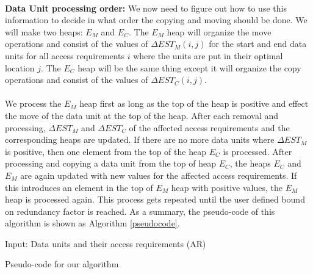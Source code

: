 \\
{\bf Data Unit processing order:} We now need to figure out how to use this
information to decide in what order the copying and moving should be done. We will make two heaps: $E_M$ and $E_C$. The $E_M$ heap will organize the move operations and consist of the values of $\Delta EST_M(i,j)$ for the start and end data units for all access requirements $i$ where the units are put in their optimal location $j$. The $E_C$ heap will be the same thing except it will organize the copy operations and consist of the values of $\Delta EST_C(i,j)$.\\
\\
We process the $E_M$ heap first as long as the top of the heap is positive and
effect the move of the data unit at the top of the heap. After each removal and
processing, $\Delta EST_M$ and $\Delta EST_C$ of the affected access
requirements and the corresponding heaps are updated. If there are no more data
units where $\Delta EST_M$ is positive, then one element from the top of the
heap $E_C$ is processed. After processing and copying a data unit from the top
of heap $E_C$, the heaps $E_C$ and $E_M$ are again updated with new values for
the affected access requirements. If this introduces an element in the top of
$E_M$ heap with positive values, the $E_M$ heap is processed again. This
process gets repeated until the user defined bound on redundancy factor is
reached. As a summary, the pseudo-code of this algorithm is shown as Algorithm
\ref{pseudocode}.

\begin{algorithm}[t]
Input: Data units and their access requirements (AR) \;
\caption{Pseudo-code for our algorithm}
\label{pseudocode}
\end{algorithm}

